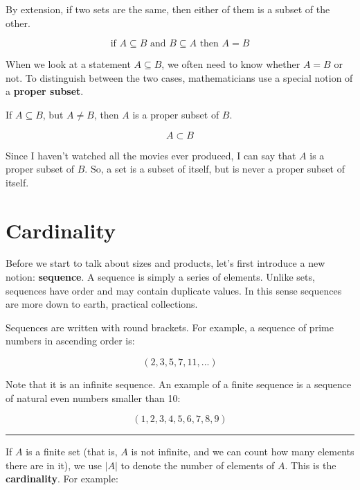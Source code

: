 \documentclass[a4paper, justified, notitlepage, sfsidenotes, notoc]{tufte-book}
\begin{document}
By extension, if two sets are the same, then either of them is a subset of the other.

\begin{equation}
\textrm{if } A \subseteq B \textrm{ and } B \subseteq A \textrm{ then } A = B
\end{equation}

When we look at a statement \(A \subseteq B\), we often need to know whether \(A = B\) or not. To distinguish between the two cases, mathematicians use a special notion of a \textbf{proper subset}.

If \(A \subseteq B\), but \(A \neq B\), then \(A\) is a proper subset of \(B\).

\begin{equation}
A \subset B
\end{equation}

Since I haven't watched all the movies ever produced, I can say that \(A\) is a proper subset of \(B\). So, a set is a subset of itself, but is never a proper subset of itself.
\section{Cardinality}
\label{sec:org8a30fe7}

Before we start to talk about sizes and products, let's first introduce a new notion:  \textbf{\textbf{sequence}}. A sequence is simply a series of elements. Unlike sets, sequences have order and may contain duplicate values. In this sense sequences are more down to earth, practical collections.

Sequences are written with round brackets. For example, a sequence of prime numbers in ascending order is:

\begin{equation}
(2, 3, 5, 7, 11, ...)
\end{equation}

Note that it is an infinite sequence. An example of a finite sequence is a sequence of natural even numbers smaller than 10:

\begin{equation}
(1, 2, 3, 4, 5, 6, 7, 8, 9)
\end{equation}

\noindent\rule{\textwidth}{0.5pt}

If \(A\) is a finite set (that is, \(A\) is not infinite, and we can count how many elements there are in it), we use \(|A|\) to denote the number of elements of \(A\). This is the \textbf{\textbf{cardinality}}. For example:
\end{document}
